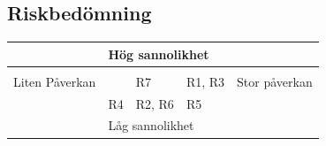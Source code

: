 \documentclass[11pt]{article}
\begin{document}
\subsection{Riskbedömning}
\label{sec:org1f4a18b}

\begin{center}
\begin{tabular}{|l|l|l|l|l|}
\hline
 & \multicolumn{3}{l|}{Hög sannolikhet} & \\
\hline
 & & & & \\
\cline{2-4}
Liten Påverkan & & R7 & R1, R3 & Stor påverkan \\
\cline{2-4}
 & R4 & R2, R6 & R5 & \\
\hline
 & \multicolumn{3}{l|}{Låg sannolikhet} & \\
\hline
\end{tabular}
\end{center}
\end{document}
